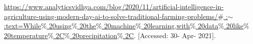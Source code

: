 \documentclass[12pt]{article}
\renewcommand{\_}{\kern-1.5pt\textunderscore\kern-1.5pt}
\begin{document}
\href{https://www.analyticsvidhya.com/blog/2020/11/artificial-intelligence-in-agriculture-using-modern-day-ai-to-solve-traditional-farming-problems/#:~:text=While\%20using\%20the\%20machine\%20learning,with\%20data\%20like\%20temperature\%2C\%20precipitation\%2C}{\textcolor[HTML]{1155CC}{\ul{https://www.analyticsvidhya.com/blog/2020/11/artificial-intelligence-in-agriculture-using-modern-day-ai-to-solve-traditional-farming-problems/$\#$ :$ \sim $ :text=While$\%$ 20using$\%$ 20the$\%$ 20machine$\%$ 20learning,with$\%$ 20data$\%$ 20like$\%$ 20temperature$\%$ 2C$\%$ 20precipitation$\%$ 2C}}}{\fontsize{9pt}{10.8pt}\selectfont . [Accessed: 30- Apr- 2021].}

\vspace{\baselineskip}

\vspace{\baselineskip}
\printbibliography
\end{document}
